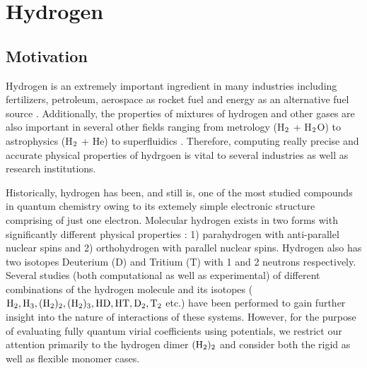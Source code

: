 \chapter{Hydrogen}
    \section{Motivation}
        Hydrogen is an extremely important ingredient in many industries including fertilizers, petroleum, aerospace as rocket fuel and energy as an alternative fuel source \cite{Jacobsen2007}. Additionally, the properties of mixtures of hydrogen and other gases are also important in several other fields ranging from metrology (H$_{\rm 2}$ + H$_{\rm 2}$O) \cite{Hodges2004} to astrophysics (H$_{\rm 2}$ + He) \cite{Boothroyd2002,Boothroyd2003} to superfluidics \cite{Patkowski2008,Grebenev2000}. Therefore, computing really precise and accurate physical properties of hydrgoen is vital to several industries as well as research institutions.

        Historically, hydrogen has been, and still is, one of the most studied compounds in quantum chemistry owing to its extemely simple electronic structure comprising of just one electron. Molecular hydrogen exists in two forms with significantly different physical properties \cite{Jacobsen2007}: 1) parahydrogen with anti-parallel nuclear spins and 2) orthohydrogen with parallel nuclear spins. Hydrogen also has two isotopes Deuterium (D) and Tritium (T) with 1 and 2 neutrons respectively. Several studies \cite{Goodwin1963,Kolos1986,Schwenke1988,Mielke2002,Manzhos2010,Garberoglio2010,Garberoglio2012,Sakoda2012,Garberoglio2013,Garberoglio2014} (both computational as well as experimental) of different combinations of the hydrogen molecule and its isotopes ($\allowbreak {\rm H_2, H_3, (H_2)_2, (H_2)_3, HD, HT, D_2, T_2}$ etc.) have been performed to gain further insight into the nature of interactions of these systems. However, for the purpose of evaluating fully quantum virial coefficients using \abInitio potentials, we restrict our attention primarily to the hydrogen dimer ${\rm (H_2)_2}$ and consider both the rigid as well as flexible monomer cases.


